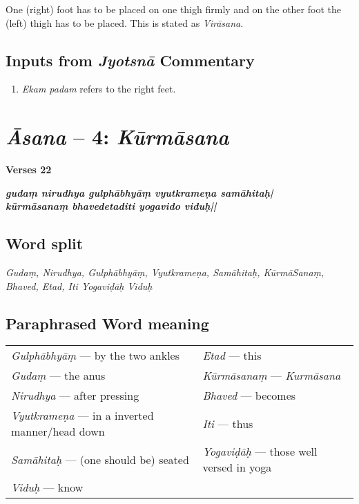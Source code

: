 One (right) foot has to be placed on one thigh firmly and on the other foot the (left) thigh has to be placed. This is stated as \textit{Virāsana}.

\subsection*{Inputs from \textit{Jyotsnā} Commentary}

\begin{enumerate}
\item \textit{Ekam padam} refers to the right feet.
\end{enumerate}

\section*{\textit{Āsana} -- 4: \textit{Kūrmāsana}}

\noindent 
\textbf{Verses 22}

\begin{shloka}
\textit{\textbf{gudaṃ nirudhya gulphābhyāṃ vyutkrameṇa samāhitaḥ|}\\
\textbf{kūrmāsanaṃ bhavedetaditi yogavido viduḥ||}}
\end{shloka}

\subsection*{Word split}

\textit{Gudaṃ, Nirudhya, Gulphābhyāṃ, Vyutkrameṇa, Samāhitaḥ, Kūrmā\-Sanaṃ, Bhaved, Etad, Iti Yogaviḍāḥ Viduḥ}

\subsection*{Paraphrased Word meaning}

\begin{longtable}{>{\noindent\raggedright}p{5cm}>{\noindent\raggedright}p{5cm}}
\textit{Gulphābhyāṃ} --- by the two ankles  & \textit{Etad} --- this\tabularnewline
\textit{Gudaṃ} --- the anus  & \textit{Kūrmāsanaṃ} --- \textit{Kurmāsana}\tabularnewline
\textit{Nirudhya} --- after pressing & \textit{Bhaved} --- becomes\tabularnewline
\textit{Vyutkrameṇa} --- in a inverted manner/head down & \textit{Iti} --- thus\tabularnewline
\textit{Samāhitaḥ} --- (one should be) seated  & \textit{Yogaviḍāḥ} --- those well versed in yoga\tabularnewline
\textit{Viduḥ} --- know & 
\end{longtable}

